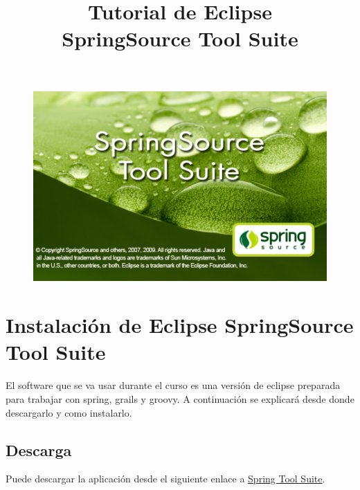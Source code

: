 \documentclass[a4paper,12pt,spanish]{article}
\title{Tutorial de Eclipse \\SpringSource Tool Suite}
\begin{document}
\begin{titlepage}
  \maketitle
  \begin{figure}[h!]
    \centering
    \includegraphics[scale=0.75]{sts}
    \label{fig:Portada}
  \end{figure}
\end{titlepage}
 
\tableofcontents
\newpage 

\section{Instalación de Eclipse SpringSource Tool Suite}

El software que se va usar durante el curso es una versión de eclipse preparada para trabajar con spring, grails y groovy. A continuación se explicará desde donde descargarlo y como instalarlo.

\subsection{Descarga}

Puede descargar la aplicación desde el siguiente enlace a \href{http://www.springsource.com/products/springsource-google-download?utm\_source=eclipse.org\&utm\_medium=web\&utm\_content=promotedDL\&utm\_campaign=STS}{Spring Tool Suite}.
\end{document}
